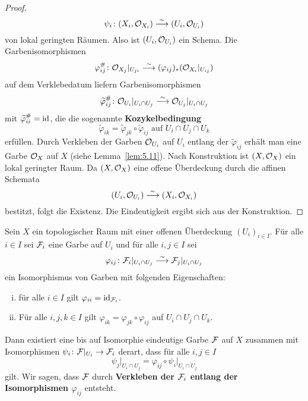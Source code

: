 \begin{lem}
\begin{proof}
		\[
			\psi_i\colon(X_i,\mathcal{O}_{X_i})\overset{\sim}{\longrightarrow} (U_i,\mathcal{O}_{U_i})	
		\]
		von lokal geringten Räumen. Also ist $(U_i,\mathcal{O}_{U_i})$ ein Schema. Die Garbenisomorphismen
		\[
			\varphi^{\#}_{ij}\colon \mathcal{O}_{X_j}\vert_{U_{ji}} \overset{\sim}{\longrightarrow} (\varphi_{ij})_*(\mathcal{O}_{X_i}\vert_{U_{ij}})
		\]
		auf dem Verklebedatum liefern Garbenisomorphismen 
		\[
			\widetilde{\varphi}^{\#}_{ij}\colon \mathcal{O}_{U_i}\vert_{U_i \cap U_j} \overset{\sim}{\longrightarrow} \mathcal{O}_{U_j}\vert_{U_i \cap U_j}
		\]
		mit $\widetilde{\varphi}^{\#}_{ii} = \operatorname{id}$, die die sogenannte \textbf{Kozykelbedingung}
		\[
			\widetilde{\varphi}_{ik} = \widetilde{\varphi}_{jk} \circ \widetilde{\varphi}_{ij} \text{ auf } U_i \cap U_j \cap U_k
		\]
		erfüllen. Durch Verkleben der Garben $\mathcal{O}_{U_i}$ auf $U_i$ entlang der $\widetilde{\varphi}_{ij}$ erhält man eine Garbe $\mathcal{O}_X$ auf $X$ (siehe Lemma~\ref{lem:5.11}). Nach Konstruktion ist $(X,\mathcal{O}_X)$ ein lokal geringter Raum. Da $(X,\mathcal{O}_X)$ eine offene Überdeckung durch die affinen Schemata
		\[
			(U_i,\mathcal{O}_{U_i}) \overset{\sim}{\longrightarrow} (X_i, \mathcal{O}_{X_i})
		\]
		bestitzt, folgt die Existenz. Die Eindeutigkeit ergibt sich aus der Konstruktion.
	\end{proof}
\end{lem}

\begin{lem}
\label{lem:5.11}
	Sein $X$ ein topologischer Raum mit einer offenen Überdeckung $(U_i)_{i\in I}$. Für alle $i \in I$ sei $\mathcal{F}_i$ eine Garbe auf $U_i$ und für alle $i,j \in I$ sei
	\[
		\varphi_{ij}\colon \mathcal{F}_i\vert_{U_i\cap U_j} \overset{\sim}{\longrightarrow} \mathcal{F}_j\vert_{U_i\cap U_j}
	\]
	ein Isomorphismus von Garben mit folgenden Eigenschaften:
	\begin{enumerate}[i)]
		\item für alle $i \in I$ gilt $\varphi_{ii} = \operatorname{id}_{\mathcal{F}_i}$.
		\item Für alle $i,j,k \in I$ gilt $\varphi_{ik} = \varphi_{jk} \circ \varphi_{ij}$ auf $U_i \cap U_j \cap U_k$.
	\end{enumerate}
	Dann existiert eine bis auf Isomorphie eindeutige Garbe $\mathcal{F}$ auf $X$ zusammen mit Isomorphismen $\psi_i \colon \mathcal{F}\vert_{U_i} \to \mathcal{F}_i$ derart, dass für alle $i,j \in I$
	\[
                \psi_j\vert_{U_i \cap U_j} = \varphi_{ij} \circ \psi_i\vert_{U_i\cap U_j}
	\]
	gilt. Wir sagen, dass $\mathcal{F}$ durch \textbf{Verkleben der $\mathcal{F}_i$ entlang der Isomorphismen $\varphi_{ij}$} entsteht.
\end{lem}
